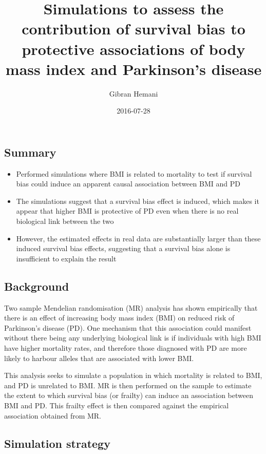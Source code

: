 \documentclass[]{article}
\title{Simulations to assess the contribution of survival bias to protective
associations of body mass index and Parkinson's disease}
\author{Gibran Hemani}
\date{2016-07-28}
\begin{document}
\maketitle


\subsection{Summary}\label{summary}

\begin{itemize}
\itemsep1pt\parskip0pt
\item
  Performed simulations where BMI is related to mortality to test if
  survival bias could induce an apparent causal association between BMI
  and PD
\item
  The simulations suggest that a survival bias effect is induced, which
  makes it appear that higher BMI is protective of PD even when there is
  no real biological link between the two
\item
  However, the estimated effects in real data are substantially larger
  than these induced survival bias effects, suggesting that a survival
  bias alone is insufficient to explain the result
\end{itemize}

\subsection{Background}\label{background}

Two sample Mendelian randomisation (MR) analysis has shown empirically
that there is an effect of increasing body mass index (BMI) on reduced
risk of Parkinson's disease (PD). One mechanism that this association
could manifest without there being any underlying biological link is if
individuals with high BMI have higher mortality rates, and therefore
those diagnosed with PD are more likely to harbour alleles that are
associated with lower BMI.

This analysis seeks to simulate a population in which mortality is
related to BMI, and PD is unrelated to BMI. MR is then performed on the
sample to estimate the extent to which survival bias (or frailty) can
induce an association between BMI and PD. This frailty effect is then
compared against the empirical association obtained from MR.

\subsection{Simulation strategy}\label{simulation-strategy}
\end{document}

